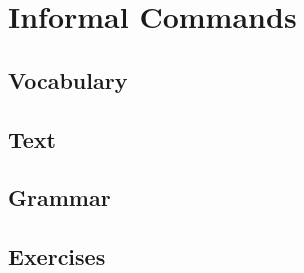 \chapter{Informal Commands}
\section*{Vocabulary}
\section*{Text}
\section*{Grammar}
\section*{Exercises}
